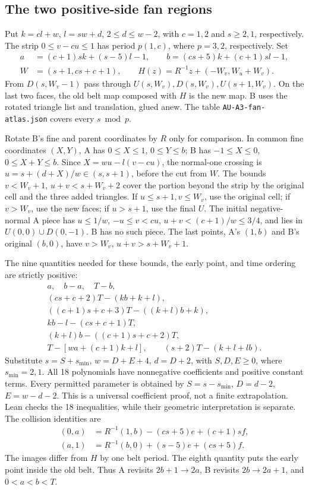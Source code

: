 \documentclass[11pt]{amsart}
\newcommand{\record}[1]{\nolinkurl{#1}}
\begin{document}
\subsection{The two positive-side fan regions}
Put $k=cl+w$, $l=sw+d$, $2\le d\le w-2$, with $c=1,2$ and
$s\ge2,1$, respectively. The strip $0\le v-cu\le1$ has period
$p(1,c)$, where $p=3,2$, respectively. Set
\[
\begin{split}
a&=(c+1)sk+(s-5)l-1,\qquad b=(cs+5)k+(c+1)sl-1,\\
W&=(s+1,cs+c+1),\qquad H(z)=R^{-1}z+(-W_v,W_u+W_v).
\end{split}
\]
From $D(s,W_v-1)$ pass through $U(s,W_v),D(s,W_v),U(s+1,W_v)$.
On the last two faces, the old belt map composed with $H$ is the new
map. B uses the rotated triangle list and translation, glued anew.
The table \record{AU-A3-fan-atlas.json} covers every $s\bmod p$.

Rotate B's fine and parent coordinates by $R$ only for comparison.
In common fine coordinates $(X,Y)$, A has $0\le X\le1$, $0\le Y\le b$;
B has $-1\le X\le0$, $0\le X+Y\le b$. Since
$X=wu-l(v-cu)$, the normal-one crossing is
$u=s+(d+X)/w\in(s,s+1)$, before the cut from $W$.
The bounds $v<W_v+1$, $u+v<s+W_v+2$ cover the portion beyond the
strip by the original cell and the three added triangles. If
$u\le s+1,v\le W_v$, use the original cell; if $v>W_v$, use the new
faces; if $u>s+1$, use the final $U$.
The initial negative-normal A piece has $u\le1/w$,
$-u\le v<cu$, $u+v<(c+1)/w\le3/4$, and lies in
$U(0,0)\cup D(0,-1)$. B has no such piece. The last points, A's
$(1,b)$ and B's original $(b,0)$, have $v>W_v$, $u+v>s+W_v+1$.

The nine quantities needed for these bounds, the early point, and
time ordering are strictly positive:
\begin{equation}\label{eq:8}
\begin{gathered}
a,\quad b-a,\quad T-b,\\
(cs+c+2)T-(kb+k+l),\\
((c+1)s+c+3)T-((k+l)b+k),\\
kb-l-(cs+c+1)T,\\
(k+l)b-((c+1)s+c+2)T,\\
T-[wa+(c+1)k+l],\qquad (s+2)T-(k+l+lb).
\end{gathered}\tag{8}
\end{equation}
Substitute $s=S+s_{\min}$, $w=D+E+4$, $d=D+2$, with
$S,D,E\ge0$, where $s_{\min}=2,1$. All 18 polynomials have
nonnegative coefficients and positive constant terms. Every permitted
parameter is obtained by $S=s-s_{\min}$, $D=d-2$, $E=w-d-2$.
This is a universal coefficient proof, not a finite extrapolation.
Lean checks the 18 inequalities, while their geometric interpretation
is separate. The collision identities are
\begin{equation}\label{eq:9}
\begin{aligned}
(0,a)&=R^{-1}(1,b)-(cs+5)e+(c+1)sf,\\
(a,1)&=R^{-1}(b,0)+(s-5)e+(cs+5)f.
\end{aligned}\tag{9}
\end{equation}
The images differ from $H$ by one belt period. The eighth quantity
puts the early point inside the old belt. Thus A revisits
$2b+1\to2a$, B revisits $2b\to2a+1$, and $0<a<b<T$.
\end{document}
